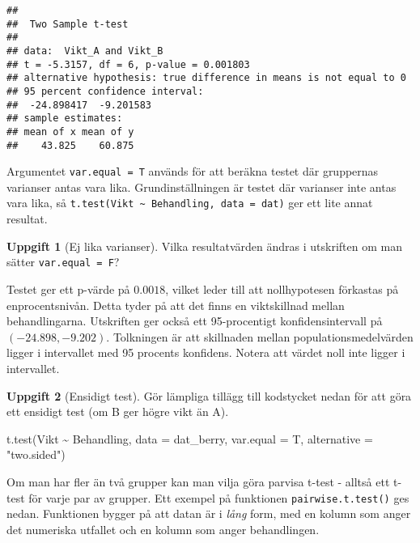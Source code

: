\documentclass[
]{book}
\newenvironment{Shaded}{\begin{snugshade}}{\end{snugshade}}
\newcommand{\AttributeTok}[1]{\textcolor[rgb]{0.77,0.63,0.00}{#1}}
\newcommand{\FunctionTok}[1]{\textcolor[rgb]{0.00,0.00,0.00}{#1}}
\newcommand{\NormalTok}[1]{#1}
\newcommand{\SpecialCharTok}[1]{\textcolor[rgb]{0.00,0.00,0.00}{#1}}
\newcommand{\StringTok}[1]{\textcolor[rgb]{0.31,0.60,0.02}{#1}}
\theoremstyle{definition}
\theoremstyle{definition}
\theoremstyle{definition}
\newtheorem{exercise}{Uppgift}[chapter]
\theoremstyle{definition}
\theoremstyle{remark}
\begin{document}
\begin{verbatim}
## 
##  Two Sample t-test
## 
## data:  Vikt_A and Vikt_B
## t = -5.3157, df = 6, p-value = 0.001803
## alternative hypothesis: true difference in means is not equal to 0
## 95 percent confidence interval:
##  -24.898417  -9.201583
## sample estimates:
## mean of x mean of y 
##    43.825    60.875
\end{verbatim}

Argumentet \texttt{var.equal\ =\ T} används för att beräkna testet där gruppernas varianser antas vara lika. Grundinställningen är testet där varianser inte antas vara lika, så \texttt{t.test(Vikt\ \textasciitilde{}\ Behandling,\ data\ =\ dat)} ger ett lite annat resultat.

\begin{exercise}[Ej lika varianser]
Vilka resultatvärden ändras i utskriften om man sätter \texttt{var.equal\ =\ F}?
\end{exercise}

Testet ger ett p-värde på \(0.0018\), vilket leder till att nollhypotesen förkastas på enprocentsnivån. Detta tyder på att det finns en viktskillnad mellan behandlingarna. Utskriften ger också ett 95-procentigt konfidensintervall på \((-24.898, -9.202)\). Tolkningen är att skillnaden mellan populationsmedelvärden ligger i intervallet med 95 procents konfidens. Notera att värdet noll inte ligger i intervallet.

\begin{exercise}[Ensidigt test]

Gör lämpliga tillägg till kodstycket nedan för att göra ett ensidigt test (om B ger högre vikt än A).

\begin{Shaded}
\begin{Highlighting}[]
\FunctionTok{t.test}\NormalTok{(Vikt }\SpecialCharTok{\textasciitilde{}}\NormalTok{ Behandling, }\AttributeTok{data =}\NormalTok{ dat\_berry, }\AttributeTok{var.equal =}\NormalTok{ T, }\AttributeTok{alternative =} \StringTok{"two.sided"}\NormalTok{)}
\end{Highlighting}
\end{Shaded}

\end{exercise}

Om man har fler än två grupper kan man vilja göra parvisa t-test - alltså ett t-test för varje par av grupper.
Ett exempel på funktionen \texttt{pairwise.t.test()} ges nedan. Funktionen bygger på att datan är i \emph{lång} form, med en kolumn som anger det numeriska utfallet och en kolumn som anger behandlingen.
\end{document}
